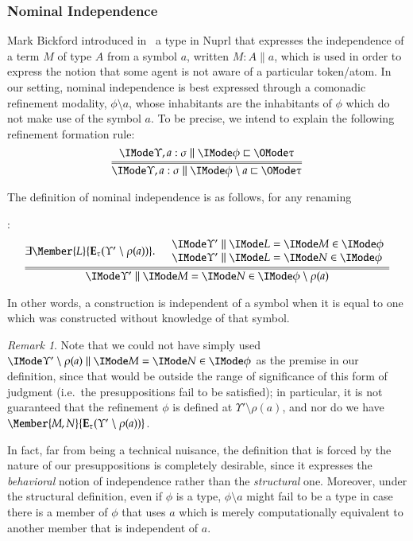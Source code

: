 \documentclass[11pt]{article}
\theoremstyle{definition}
\theoremstyle{notation}
\theoremstyle{remark}
\newtheorem{remark}[thm]{Remark}
\numberwithin{equation}{section}
\newcommand\Exprs{\mathbf{E}}
\begin{document}
\subsubsection{Nominal Independence}

\newcommand\Indep[2]{#1\setminus #2}

Mark Bickford introduced in~\cite{bickford:2008} a type in Nuprl that expresses
the independence of a term $M$ of type $A$ from a symbol $a$, written
$M:A\parallel a$, which is used in order to express the notion that some agent
is not aware of a particular token/atom. In our setting, nominal independence
is best expressed through a comonadic refinement modality, $\Indep{\phi}{a}$, whose
inhabitants are the inhabitants of $\phi$ which do not make use of the symbol
$a$. To be precise, we intend to explain the following refinement formation
rule:
\[
  \infer={
    \Refines{\Upsilon,a:\sigma}{\Indep{\phi}{a}}{\tau}
  }{
    \Refines{\Upsilon,a:\sigma}{\phi}{\tau}
  }
\]

The definition of nominal independence is as follows, for any renaming
%
:
\[
  \infer={
    \RMemEq{\Upsilon'}{M}{N}{\Indep{\phi}{\rho(a)}}
  }{
    \exists\Member{L}{\Exprs_\tau(\Upsilon'\setminus \rho(a))}.
    \begin{array}{l}
      \quad \RMemEq{\Upsilon'}{L}{M}{\phi}\\
      \quad \RMemEq{\Upsilon'}{L}{N}{\phi}
    \end{array}
  }
\]

In other words, a construction is independent of a symbol when it is equal to
one which was constructed without knowledge of that symbol.

\begin{remark}
  Note that we could not have simply used
  $\RMemEq{\Upsilon'\setminus\rho(a)}{M}{N}{\phi}$ as the premise in our
  definition, since that would be outside the range of significance of this
  form of judgment (i.e.\ the presuppositions fail to be satisfied); in
  particular, it is not guaranteed that the refinement $\phi$ is defined at
  $\Upsilon'\setminus\rho(a)$, and nor do we have
  $\Member{M,N}{\Exprs_\tau(\Upsilon'\setminus\rho(a))}$.

  In fact, far from being a technical nuisance, the definition that is forced
  by the nature of our presuppositions is completely desirable, since it
  expresses the \emph{behavioral} notion of independence rather than the
  \emph{structural} one. Moreover, under the structural definition, even if
  $\phi$ is a type, $\phi\setminus a$ might fail to be a type in case there is
  a member of $\phi$ that uses $a$ which is merely computationally equivalent
  to another member that is independent of $a$.
\end{remark}
\end{document}
